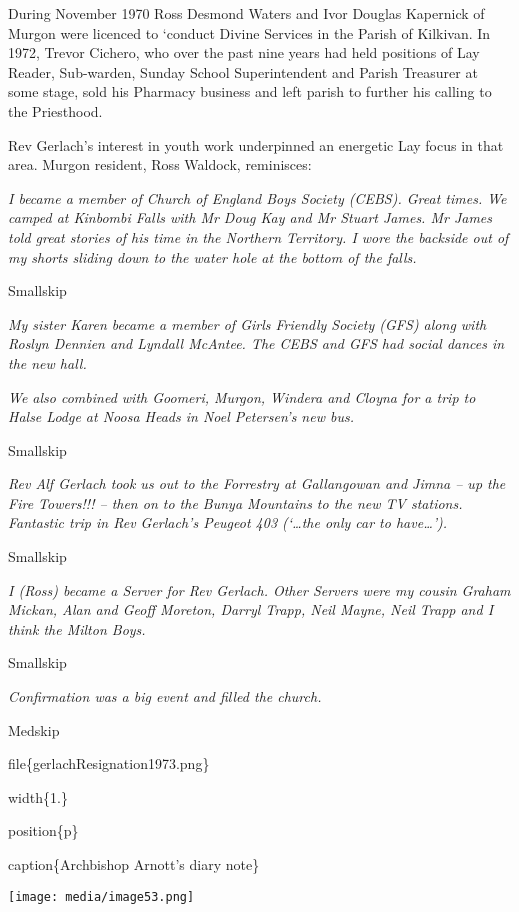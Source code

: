 During November 1970 Ross Desmond Waters and Ivor Douglas Kapernick of Murgon were licenced to `conduct Divine Services in the Parish of Kilkivan. In 1972, Trevor Cichero, who over the past nine years had held positions of Lay Reader, Sub-warden, Sunday School Superintendent and Parish Treasurer at some stage, sold his Pharmacy business and left parish to further his calling to the Priesthood.

Rev Gerlach's interest in youth work underpinned an energetic Lay focus in that area. Murgon resident, Ross Waldock, reminisces:

\emph{I became a member of Church of England Boys Society (CEBS). Great times. We camped at Kinbombi Falls with Mr Doug Kay and Mr Stuart James. Mr James told great stories of his time in the Northern Territory. I wore the backside out of my shorts sliding down to the water hole at the bottom of the falls.}

Smallskip

\emph{My sister Karen became a member of Girls Friendly Society (GFS) along with Roslyn Dennien and Lyndall McAntee. The CEBS and GFS had social dances in the new hall.}

\emph{We also combined with Goomeri, Murgon, Windera and Cloyna for a trip to Halse Lodge at Noosa Heads in Noel Petersen's new bus.}

Smallskip

\emph{Rev Alf Gerlach took us out to the Forrestry at Gallangowan and Jimna -- up the Fire Towers!!! -- then on to the Bunya Mountains to the new TV stations. Fantastic trip in Rev Gerlach's Peugeot 403 (`\ldots the only car to have\ldots').}

Smallskip

\emph{I (Ross) became a Server for Rev Gerlach. Other Servers were my cousin Graham Mickan, Alan and Geoff Moreton, Darryl Trapp, Neil Mayne, Neil Trapp and I think the Milton Boys.}

Smallskip

\emph{Confirmation was a big event and filled the church.}

Medskip

file\{gerlachResignation1973.png\}

width\{1.\}

position\{p\}

caption\{Archbishop Arnott's diary note\}

\texttt{[image: media/image53.png]}

